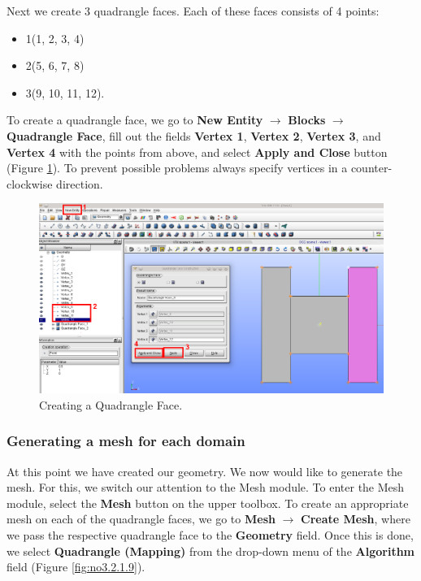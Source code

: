 Next we create 3 quadrangle faces. Each of these faces consists of 4 points:
\begin{itemize}
 \item 1(1, 2, 3, 4)
 \item 2(5, 6, 7, 8)
 \item 3(9, 10, 11, 12).
\end{itemize}

To create a quadrangle face, we go to \textbf{New Entity} $\rightarrow$ \textbf{Blocks} $\rightarrow$ \textbf{Quadrangle Face}, fill out the fields \textbf{Vertex 1}, \textbf{Vertex 2}, \textbf{Vertex 3}, and \textbf{Vertex 4} with the points from above, and select \textbf{Apply and Close} button (Figure \ref{fig:no3.2.1.7}). To prevent possible problems always specify vertices in a counter-clockwise direction.

\begin{figure}[tbp]
\begin{center}
\includegraphics[scale=0.4]{figures/SalomeStep2.png}
\caption{Creating a Quadrangle Face.}
\label{fig:no3.2.1.7}
\end{center}
\end{figure}

\subsubsection{Generating a mesh for each domain}

At this point we have created our geometry. We now would like to generate the mesh. For this, we switch our attention to the Mesh module. To enter the Mesh module, select the \textbf{Mesh} button on the upper toolbox. To create an appropriate mesh on each of the quadrangle faces, we go to \textbf{Mesh} $\rightarrow$ \textbf{Create Mesh}, where we pass the respective quadrangle face to the \textbf{Geometry} field. Once this is done, we select \textbf{Quadrangle (Mapping)} from the drop-down menu of the \textbf{Algorithm} field (Figure \ref{fig:no3.2.1.9}).

